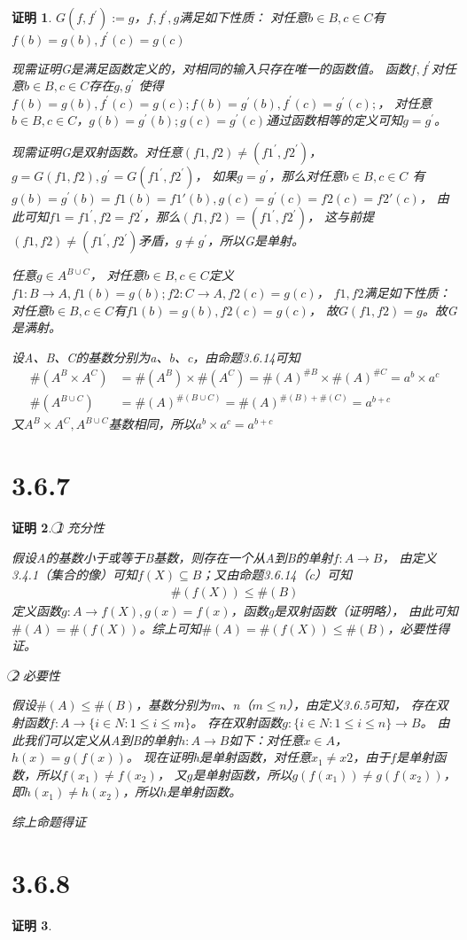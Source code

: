 \documentclass{article}
\theoremstyle{mystyle}
\theoremstyle{zproofstyle}
\newtheorem*{zproof}{证明}
\begin{document}
\begin{zproof}
  $G(f,f^\prime):=g$，$f,f^\prime,g$满足如下性质：
  对任意$b \in B, c \in C$有$f(b)=g(b),f^\prime(c)=g(c)$

  现需证明G是满足函数定义的，对相同的输入只存在唯一的函数值。
  函数$f,f^\prime$对任意$b \in B, c \in C$存在$g, g^\prime$
  使得$f(b)=g(b),f^\prime(c)=g(c); f(b)=g^\prime(b),f^\prime(c)=g^\prime(c);$，
  对任意$b \in B, c \in C$，$g(b)=g^\prime(b);g(c)=g^\prime(c)$通过函数相等的定义可知$g=g^\prime$。

  现需证明G是双射函数。对任意$(f1,f2) \neq (f1^\prime,f2^\prime)$，
  $g=G(f1,f2),g^\prime=G(f1^\prime,f2^\prime)$，
  如果$g = g^\prime$，那么对任意$b \in B, c \in C$
  有$g(b)=g^\prime(b)=f1(b)=f1\prime(b),g(c)=g^\prime(c)=f2(c)=f2\prime(c)$，
  由此可知$f1=f1^\prime,f2=f2^\prime$，那么$(f1,f2) = (f1^\prime,f2^\prime)$，
  这与前提$(f1,f2) \neq (f1^\prime,f2^\prime)$矛盾，$g \neq g^\prime$，所以G是单射。

  任意$g \in A^{B \cup C}$，
  对任意$b \in B, c \in C$定义$f1:B \rightarrow A, f1(b)=g(b); f2: C \rightarrow A, f2(c)=g(c)$，
  $f1,f2$满足如下性质：对任意$b \in B, c \in C$有$f1(b)=g(b),f2(c)=g(c)$，
  故$G(f1,f2)=g$。故G是满射。

  设A、B、C的基数分别为a、b、c，由命题3.6.14可知
  \begin{align}
    \#(A^B \times A^C) & = \#(A^B) \times \#(A^C) = \#(A)^{\#B} \times \#(A)^{\#C} = a^b \times a^c \\
    \#(A^{B \cup C})   & = \#(A)^{\#(B \cup C)} = \#(A)^{\#(B) + \#(C)} = a^{b+c}
  \end{align}
  又$A^B \times A^C,A^{B \cup C}$基数相同，所以$a^b \times a^c = a^{b+c}$
\end{zproof}

\section*{3.6.7}
\begin{zproof}
  \textcircled{1} 充分性

  假设A的基数小于或等于B基数，则存在一个从A到B的单射$f: A \rightarrow B$，
  由定义3.4.1（集合的像）可知$f(X) \subseteq B$；又由命题3.6.14（c）可知
  \begin{align}
    \#(f(X)) \leq \#(B)
  \end{align}
  定义函数$g: A \rightarrow f(X), g(x)=f(x)$，函数g是双射函数（证明略），
  由此可知$\#(A) = \#(f(X))$。综上可知$\#(A) = \#(f(X)) \leq \#(B)$，必要性得证。

  \textcircled{2} 必要性

  假设$\#(A) \leq \#(B)$，基数分别为m、n（$m \leq n$），由定义3.6.5可知，
  存在双射函数$f: A \rightarrow \{i \in N: 1 \leq i \leq m \}$。
  存在双射函数$g: \{i \in N: 1 \leq i \leq n \} \rightarrow B$。
  由此我们可以定义从A到B的单射$h: A \rightarrow B$如下：对任意$x \in A$，$h(x)=g(f(x))$。
  现在证明h是单射函数，对任意$x_1 \neq x2$，由于$f$是单射函数，所以$f(x_1) \neq f(x_2)$，
  又$g$是单射函数，所以$g(f(x_1)) \neq g(f(x_2))$，即$h(x_1) \neq h(x_2)$，所以$h$是单射函数。

  综上命题得证

\end{zproof}

\section*{3.6.8}
\begin{zproof}

\end{zproof}
\end{document}
